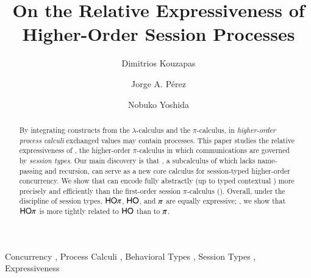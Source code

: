 \documentclass[preprint,11pt]{elsarticle}
\begin{document}
\begin{frontmatter}

\title{On the Relative Expressiveness of
Higher-Order Session Processes
}


\author[gl]{Dimitrios Kouzapas}
\address[gl]{University of Glasgow, UK
}

\author[gr]{Jorge A. P\'{e}rez}
\address[gr]{University of Groningen \& CWI, Amsterdam, The Netherlands\\
}

\author[ic]{Nobuko Yoshida}
\address[ic]{Imperial College London, UK
}






%

\begin{abstract}
By integrating
constructs from the $\lambda$-calculus and 
the $\pi$-calculus,
in \emph{higher-order process calculi} exchanged values may contain processes.
This paper studies the relative expressiveness of \HOp, 
the higher-order $\pi$-calculus in
which communications are governed by \emph{session types}. 
Our main discovery is that \HO, a subcalculus of \HOp which lacks name-passing and recursion, 
can serve as a new core calculus for session-typed higher-order
concurrency. %
We show that
 \HO can encode \HOp fully abstractly 
(up to typed contextual )
more precisely and efficiently than the first-order 
session $\pi$-calculus (\sessp).
Overall, under the discipline of session types, 
$\mathsf{HO}\pi$, $\mathsf{HO}$, and $\pi$ 
are equally expressive; ,  we show that
$\mathsf{HO}\pi$ is more tightly related 
to $\mathsf{HO}$
than to $\pi$.
\end{abstract}

\begin{keyword}
Concurrency
\sep
Process Calculi
\sep
Behavioral Types
\sep
Session Types
\sep
Expressiveness
\end{keyword}

\end{frontmatter}
\end{document}
